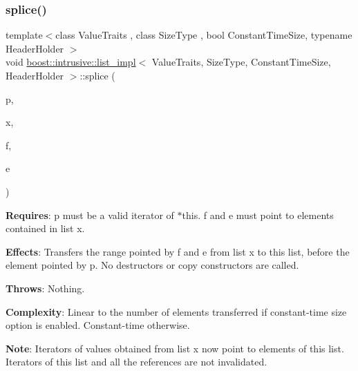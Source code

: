 \subsubsection{\texorpdfstring{splice()}{splice()}\hspace{0.1cm}{\footnotesize\ttfamily [3/4]}}
{\footnotesize\ttfamily template$<$class Value\+Traits , class Size\+Type , bool Constant\+Time\+Size, typename Header\+Holder $>$ \\
void \hyperlink{classboost_1_1intrusive_1_1list__impl}{boost\+::intrusive\+::list\+\_\+impl}$<$ Value\+Traits, Size\+Type, Constant\+Time\+Size, Header\+Holder $>$\+::splice (\begin{DoxyParamCaption}\item[{\hyperlink{classboost_1_1intrusive_1_1list__impl_af4ced710fe02662c5650d161af83d8cd}{const\+\_\+iterator}}]{p,  }\item[{\hyperlink{classboost_1_1intrusive_1_1list__impl}{list\+\_\+impl}$<$ Value\+Traits, Size\+Type, Constant\+Time\+Size, Header\+Holder $>$ \&}]{x,  }\item[{\hyperlink{classboost_1_1intrusive_1_1list__impl_af4ced710fe02662c5650d161af83d8cd}{const\+\_\+iterator}}]{f,  }\item[{\hyperlink{classboost_1_1intrusive_1_1list__impl_af4ced710fe02662c5650d161af83d8cd}{const\+\_\+iterator}}]{e }\end{DoxyParamCaption})\hspace{0.3cm}{\ttfamily [inline]}}

{\bfseries Requires}\+: p must be a valid iterator of $\ast$this. f and e must point to elements contained in list x.

{\bfseries Effects}\+: Transfers the range pointed by f and e from list x to this list, before the element pointed by p. No destructors or copy constructors are called.

{\bfseries Throws}\+: Nothing.

{\bfseries Complexity}\+: Linear to the number of elements transferred if constant-\/time size option is enabled. Constant-\/time otherwise.

{\bfseries Note}\+: Iterators of values obtained from list x now point to elements of this list. Iterators of this list and all the references are not invalidated. \mbox{\label{classboost_1_1intrusive_1_1list__impl_a561eb714c3b33ed907e4a0aaed234592}} 
